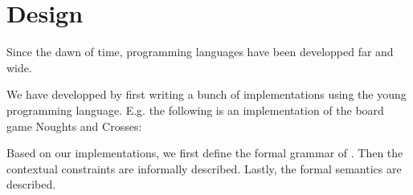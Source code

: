 \chapter{Design}
\label{chap:design}


Since the dawn of time, programming languages have been developped far and wide.

We have developped \productname{} by first writing a bunch of implementations
using the young programming language. E.g. the following is an implementation of
the board game Noughts and Crosses:


Based on our implementations, we first define the formal grammar of
\productname{}. Then the contextual constraints are informally described.
Lastly, the formal semantics are described.











